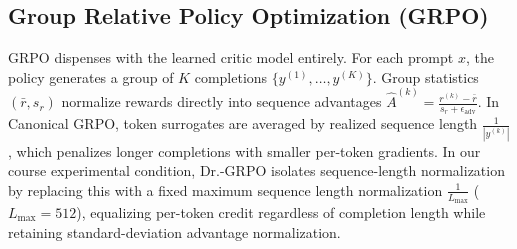 \documentclass{article}
\begin{document}
\subsection{Group Relative Policy Optimization (GRPO)}
GRPO dispenses with the learned critic model entirely. For each prompt $x$, the policy generates a group of $K$ completions $\{y^{(1)}, \dots, y^{(K)}\}$. Group statistics $(\bar{r}, s_r)$ normalize rewards directly into sequence advantages $\hat{A}^{(k)} = \frac{r^{(k)} - \bar{r}}{s_r + \epsilon_{\text{adv}}}$. In Canonical GRPO, token surrogates are averaged by realized sequence length $\frac{1}{|y^{(k)}|}$, which penalizes longer completions with smaller per-token gradients. In our course experimental condition, Dr.-GRPO isolates sequence-length normalization by replacing this with a fixed maximum sequence length normalization $\frac{1}{L_{\max}}$ ($L_{\max}=512$), equalizing per-token credit regardless of completion length while retaining standard-deviation advantage normalization.
\end{document}
